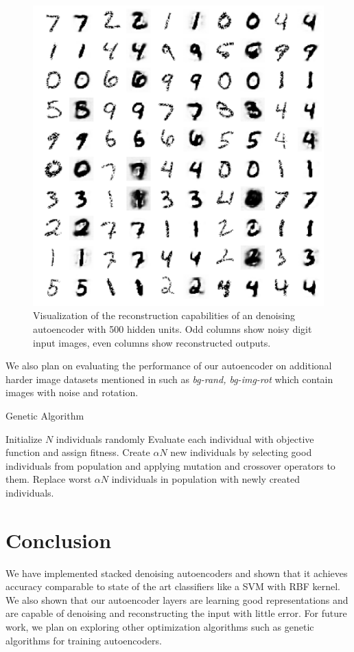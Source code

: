 \documentclass[conference]{IEEEtran}
\begin{document}
\begin{figure}[h]
\centering
\includegraphics[width=0.8\linewidth]{experiment3_2.png}
\caption{Visualization of the reconstruction capabilities of an denoising autoencoder with 500 hidden units. Odd columns show noisy digit input images, even columns show reconstructed outputs.}
\label{fig:experiment3_2}
\end{figure}

We also plan on evaluating the performance of our autoencoder on additional harder image datasets mentioned in \cite{vincent2010stacked} such as \textit{bg-rand, bg-img-rot} which contain images with noise and rotation. 

\begin{algorithm}[h]
\caption{Genetic Algorithm}
\label{alg:genetic}
\begin{algorithmic}
\STATE Initialize $N$ individuals randomly
	\STATE Evaluate each individual with objective function and assign fitness.
	\STATE Create $\alpha N$ new individuals by selecting good individuals from population and applying mutation and crossover operators to them.
	\STATE Replace worst $\alpha N$ individuals in population with newly created individuals.
\ENDFOR
\end{algorithmic}
\end{algorithm}

\section{Conclusion}
We have implemented stacked denoising autoencoders and shown that it achieves accuracy comparable to state of the art classifiers like a SVM with RBF kernel. We also shown that our autoencoder layers are learning good representations and are capable of denoising and reconstructing the input with little error. For future work, we plan on exploring other optimization algorithms such as genetic algorithms for training autoencoders. 



\end{document}
